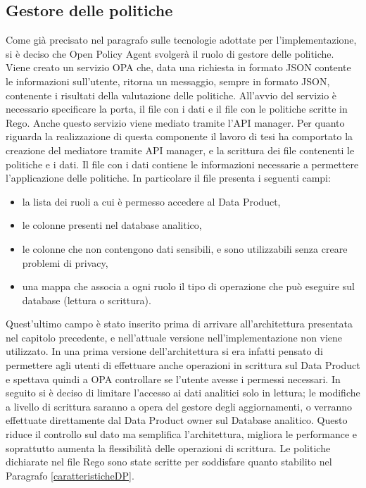 \documentclass[a4paper,12pt]{report}
\begin{document}
\subsection{Gestore delle politiche}
Come già precisato nel paragrafo sulle tecnologie adottate per l'implementazione,  si è deciso che Open Policy Agent svolgerà il ruolo di gestore delle politiche.
Viene creato un servizio OPA che, data una richiesta in formato JSON contente le informazioni sull'utente, ritorna un messaggio, sempre in formato JSON, contenente i risultati della valutazione delle politiche.
All'avvio del servizio è necessario specificare la porta, il file con i dati e il file con le politiche scritte in Rego.
Anche questo servizio viene mediato tramite l'API manager.
Per quanto riguarda la realizzazione di  questa componente il lavoro di tesi ha comportato la creazione del mediatore tramite API manager, e la scrittura dei file contenenti le politiche e i dati.
Il file con i dati contiene le informazioni necessarie a permettere l'applicazione delle politiche.
In particolare il file presenta i seguenti campi:
\begin{itemize}
    \item la lista dei ruoli a cui è permesso accedere al Data Product,
    \item le colonne presenti nel database analitico,
    \item le colonne che non contengono dati sensibili, e sono utilizzabili senza creare problemi di privacy,
    \item una mappa che associa a ogni ruolo il tipo di operazione che può eseguire sul database (lettura o scrittura).
\end{itemize}
Quest'ultimo campo è stato inserito prima di arrivare all'architettura presentata nel capitolo precedente, e nell'attuale versione nell'implementazione non viene utilizzato.
In una prima versione dell'architettura si era infatti pensato di permettere agli utenti di effettuare anche operazioni in scrittura sul Data Product e spettava quindi a OPA controllare se l'utente avesse i permessi necessari.
In seguito si è deciso di limitare l'accesso ai dati analitici solo in lettura; le modifiche a livello di scrittura saranno a opera del gestore degli aggiornamenti, o verranno effettuate direttamente dal Data Product owner sul Database analitico.
Questo riduce il controllo sul dato ma semplifica l'architettura, migliora le performance e soprattutto aumenta la flessibilità delle operazioni di scrittura.
Le politiche dichiarate nel file Rego sono state scritte per soddisfare quanto stabilito nel Paragrafo \ref{caratteristicheDP}.
\end{document}
